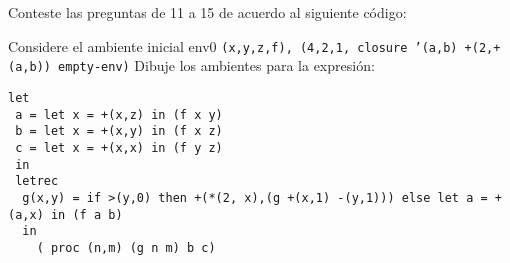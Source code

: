 Conteste las preguntas de 11 a 15 de acuerdo al siguiente código:

Considere el ambiente inicial env0 \texttt{(x,y,z,f), (4,2,1, closure '(a,b) +(2,+(a,b)) empty-env)} Dibuje los ambientes para la expresión:
\begin{lstlisting}
let
 a = let x = +(x,z) in (f x y)
 b = let x = +(x,y) in (f x z)
 c = let x = +(x,x) in (f y z)
 in
 letrec
  g(x,y) = if >(y,0) then +(*(2, x),(g +(x,1) -(y,1))) else let a = +(a,x) in (f a b)
  in
    ( proc (n,m) (g n m) b c)
\end{lstlisting}
